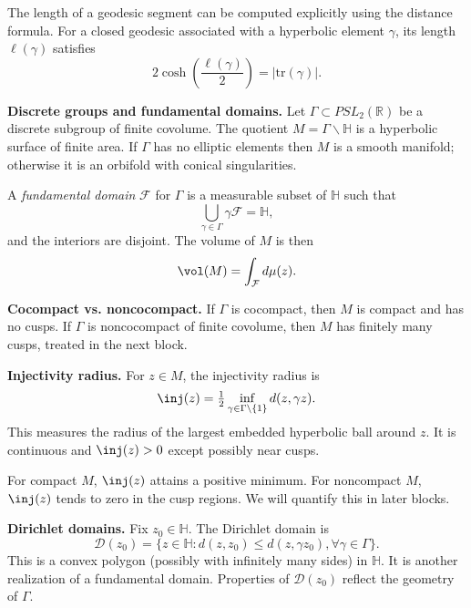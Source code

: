 \medskip

\noindent
The length of a geodesic segment can be computed explicitly using the distance formula.
For a closed geodesic associated with a hyperbolic element $\gamma$,
its length $\ell(\gamma)$ satisfies
\[
  2\cosh\!\left(\frac{\ell(\gamma)}{2}\right) = |\mathrm{tr}(\gamma)|.
\]

\medskip

\noindent\textbf{Discrete groups and fundamental domains.}
Let $\Gamma\subset PSL_{2}(\mathbb{R})$ be a discrete subgroup of finite covolume.
The quotient $M=\Gamma\backslash \mathbb{H}$ is a hyperbolic surface of finite area.
If $\Gamma$ has no elliptic elements then $M$ is a smooth manifold;
otherwise it is an orbifold with conical singularities.

\medskip

\noindent
A \emph{fundamental domain} $\mathcal{F}$ for $\Gamma$ is a measurable subset of $\mathbb{H}$
such that
\[
  \bigcup_{\gamma\in\Gamma} \gamma \mathcal{F} = \mathbb{H},
\]
and the interiors are disjoint.
The volume of $M$ is then
\[
  \vol(M) = \int_{\mathcal{F}} d\mu(z).
\]

\medskip

\noindent\textbf{Cocompact vs. noncocompact.}
If $\Gamma$ is cocompact, then $M$ is compact and has no cusps.
If $\Gamma$ is noncocompact of finite covolume,
then $M$ has finitely many cusps, treated in the next block.

\medskip

\noindent\textbf{Injectivity radius.}
For $z\in M$, the injectivity radius is
\[
  \inj(z) = \tfrac12 \inf_{\gamma\in\Gamma\setminus\{1\}} d(z,\gamma z).
\]
This measures the radius of the largest embedded hyperbolic ball around $z$.
It is continuous and $\inj(z)>0$ except possibly near cusps.

\medskip

\noindent
For compact $M$, $\inj(z)$ attains a positive minimum.
For noncompact $M$, $\inj(z)$ tends to zero in the cusp regions.
We will quantify this in later blocks.

\medskip

\noindent\textbf{Dirichlet domains.}
Fix $z_{0}\in \mathbb{H}$.
The Dirichlet domain is
\[
  \mathcal{D}(z_{0}) = \{ z\in\mathbb{H} : d(z,z_{0})\le d(z,\gamma z_{0}), \forall \gamma\in\Gamma\}.
\]
This is a convex polygon (possibly with infinitely many sides) in $\mathbb{H}$.
It is another realization of a fundamental domain.
Properties of $\mathcal{D}(z_{0})$ reflect the geometry of $\Gamma$.

